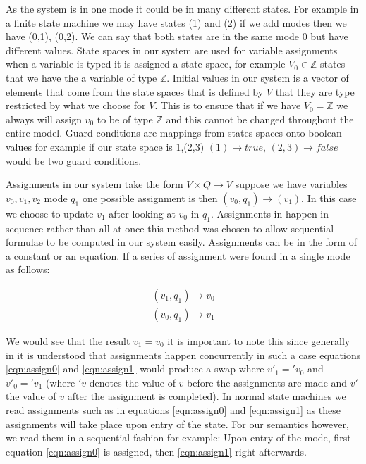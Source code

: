 As the system is in one mode it could be in many different states. For example in a finite state machine we may have states (1) and (2) if we add modes then we have (0,1), (0,2). We can say that both states are in the same mode 0 but have different values. State spaces in our system are used for variable assignments when a variable is typed it is assigned a state space, for example $V_0 \in \mathbb{Z}$ states that we have the a variable of type $\mathbb{Z}$. Initial values in our system is a vector of elements that come from the state spaces that is defined by $V$ that they are type restricted by what we choose for $V$. This is to ensure that if we have $V_0 = \mathbb{Z}$ we always will assign $v_0$ to be of type $\mathbb{Z}$ and this cannot be changed throughout the entire model. Guard conditions are mappings from states spaces onto boolean values for example if our state space is {1,(2,3)} $(1) \rightarrow true$, $(2,3) \rightarrow false$ would be two guard conditions.

Assignments in our system take the form $V \times Q \rightarrow V$ suppose we have variables $v_0,v_1,v_2$ mode $q_1$ one possible assignment is then $(v_0,q_1) \rightarrow (v_1)$. In this case we choose to update $v_1$ after looking at $v_0$ in $q_1$. Assignments in \plccharts happen in sequence rather than all at once this method was chosen to allow sequential formulae to be computed in our system easily. Assignments can be in the form of a constant or an equation. If a series of assignment were found in a single mode as follows:


\begin{align}
(v_1,q_1) \rightarrow v_0 \label{eqn:assign0} \\ 
(v_0,q_1) \rightarrow v_1 \label{eqn:assign1}
\end{align}

We would see that the result $v_1 = v_0$ it is important to note this since generally in \cite{booth}  it is understood that assignments happen concurrently in such a case equations \ref{eqn:assign0} and \ref{eqn:assign1} would produce a swap where $v'_1 = 'v_0$ and $v'_0 = 'v_1$ (where $'v$ denotes the value of $v$ before the assignments are made and $v'$ the value of $v$ after the assignment is completed). In normal state machines we read assignments such as in equations \ref{eqn:assign0} and \ref{eqn:assign1} as these assignments will take place upon entry of the state. For our semantics however, we read them in a sequential fashion for example: Upon entry of the mode, first equation \ref{eqn:assign0} is assigned, then \ref{eqn:assign1} right afterwards.

